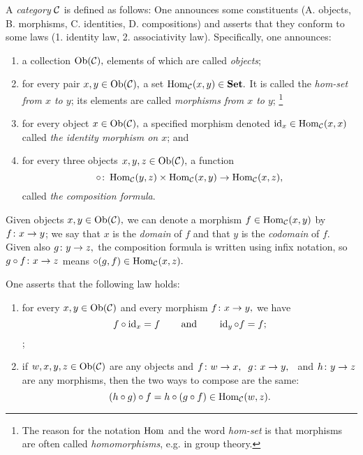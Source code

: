 \documentclass[../main/CT4S-EN-RU]{subfiles}
\begin{document}
\begin{blockRUS}
\end{blockRUS}

\begin{definitionENG}\label{def:category}
A {\em category} $\mathcal{C}$ is defined as follows: One announces some constituents (A. objects, B. morphisms, C. identities, D. compositions) and asserts that they conform to some laws (1. identity law, 2. associativity law). Specifically, one announces:
\begin{enumerate}[\hsp A.]
\item a collection $\operatorname{Ob}(\mathcal{C}),$ elements of which are called {\em objects};
\item for every pair $x,y\in\operatorname{Ob}(\mathcal{C}),$ a set $\operatorname{Hom}_\mathcal{C}(x,y)\in{\mathbf{Set}}.$ It is called the {\em hom-set from $x$ to $y$}; its elements are called {\em morphisms from $x$ to $y$};
\footnote{The reason for the notation $\operatorname{Hom}$ and the word {\em hom-set} is that morphisms are often called {\em homomorphisms}, e.g. in group theory.}
\item for every object $x\in\operatorname{Ob}(\mathcal{C}),$ a specified morphism denoted $\operatorname{id}_x\in\operatorname{Hom}_\mathcal{C}(x,x)$ called {\em the identity morphism on $x$}; and
\item for every three objects $x,y,z\in\operatorname{Ob}(\mathcal{C}),$ a function $$\circ\colon\operatorname{Hom}_\mathcal{C}(y,z)\times\operatorname{Hom}_\mathcal{C}(x,y)\rightarrow\operatorname{Hom}_\mathcal{C}(x,z),$$ called {\em the composition formula}.
\end{enumerate}
Given objects $x,y\in\operatorname{Ob}(\mathcal{C}),$ we can denote a morphism $f\in\operatorname{Hom}_\mathcal{C}(x,y)$ by $f\colon x\rightarrow y$; we say that $x$ is the {\em domain} of $f$ and that $y$ is the {\em codomain} of $f.$ Given also $g\colon y\rightarrow z,$ the composition formula is written using infix notation, so $g\circ f\colon x\rightarrow z$ means $\circ(g,f)\in\operatorname{Hom}_\mathcal{C}(x,z).$

One asserts that the following law holds:
\begin{enumerate}[\hsp 1.]
\item for every $x,y\in\operatorname{Ob}(\mathcal{C})$ and every morphism $f\colon x\rightarrow y,$ we have
$$f\circ\operatorname{id}_x=f\hspace{.3in}\textnormal{and}\hspace{.3in}\operatorname{id}_y\circ f=f;$$ ;
\item if $w,x,y,z\in\operatorname{Ob}(\mathcal{C})$ are any objects and $f\colon w\rightarrow x,\;\;g\colon x\rightarrow y,\;\;$ and $h\colon y\rightarrow z$ are any morphisms, then the two ways to compose are the same:$$(h\circ g)\circ f = h\circ(g\circ f) \in\operatorname{Hom}_\mathcal{C}(w,z).$$
\end{enumerate}
\end{definitionENG}
\end{document}

